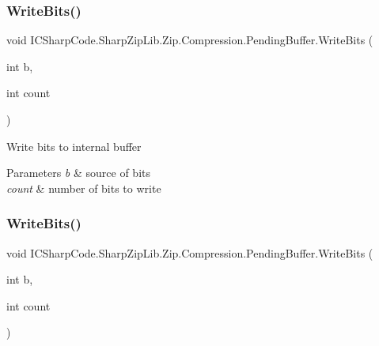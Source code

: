 \subsubsection{\texorpdfstring{Write\+Bits()}{WriteBits()}\hspace{0.1cm}{\footnotesize\ttfamily [1/2]}}
{\footnotesize\ttfamily void I\+C\+Sharp\+Code.\+Sharp\+Zip\+Lib.\+Zip.\+Compression.\+Pending\+Buffer.\+Write\+Bits (\begin{DoxyParamCaption}\item[{int}]{b,  }\item[{int}]{count }\end{DoxyParamCaption})\hspace{0.3cm}{\ttfamily [inline]}}



Write bits to internal buffer 


\begin{DoxyParams}{Parameters}
{\em b} & source of bits\\
\hline
{\em count} & number of bits to write\\
\hline
\end{DoxyParams}
\mbox{\label{class_i_c_sharp_code_1_1_sharp_zip_lib_1_1_zip_1_1_compression_1_1_pending_buffer_a64bcba2bec299128150f13ba0afeec76}} 
\subsubsection{\texorpdfstring{Write\+Bits()}{WriteBits()}\hspace{0.1cm}{\footnotesize\ttfamily [2/2]}}
{\footnotesize\ttfamily void I\+C\+Sharp\+Code.\+Sharp\+Zip\+Lib.\+Zip.\+Compression.\+Pending\+Buffer.\+Write\+Bits (\begin{DoxyParamCaption}\item[{int}]{b,  }\item[{int}]{count }\end{DoxyParamCaption})\hspace{0.3cm}{\ttfamily [inline]}}



